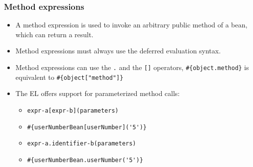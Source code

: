 \documentclass[10pt,xcolor=pdflatex]{beamer}
\begin{document}
\begin{frame}[containsverbatim]\frametitle{Method expressions}
	\begin{itemize}
    	\item A method expression is used to invoke an arbitrary public method of a bean, which can return a result.
		\item Method expressions must always use the deferred evaluation syntax.
		\item Method expressions can use the \verb;.; and the \verb;[]; operators, \verb;#{object.method}; is equivalent to \verb;#{object["method"]};
		\item The EL offers support for parameterized method calls:
		  \begin{itemize}
            \item \verb;expr-a[expr-b](parameters);
 			\item[] \verb;#{userNumberBean[userNumber]('5')};
			\item \verb;expr-a.identifier-b(parameters);
			\item[] \verb;#{userNumberBean.userNumber('5')};
		  \end{itemize}
    \end{itemize}
\end{frame}
\end{document}
